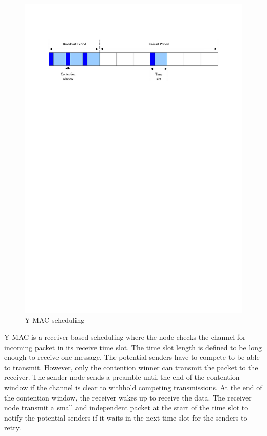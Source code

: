 \begin{figure}
\centering
\includegraphics[trim=2cm 22cm 2cm 3cm, clip=true, totalheight=0.17\textheight]{ymac.pdf}
\caption{Y-MAC scheduling}
\label{fig_ymac}
\end{figure}

Y-MAC is a receiver based scheduling where the node checks the channel for incoming packet in its receive time slot. The time slot length is defined to be long enough to receive one message. The potential senders have to compete to be able to transmit. However, only the contention winner can transmit the packet to the receiver. The sender node sends a preamble until the end of the contention window if the channel is clear to withhold competing transmissions. At the end of the contention window, the receiver wakes up to receive the data. The receiver node transmit a small and independent packet at the start of the time slot to notify the potential senders if it waits in the next time slot for the senders to retry.

